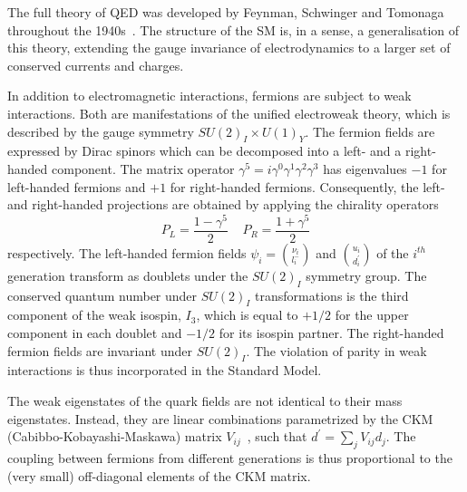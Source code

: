 The full theory of QED was developed by Feynman, Schwinger and Tomonaga throughout the 1940s~\cite{PhysRev.75.486}.  The structure of the SM is, in a sense, a generalisation of this theory, extending the gauge invariance of electrodynamics to a larger set of conserved currents and charges. 

In addition to electromagnetic interactions, fermions are subject to weak interactions. Both are manifestations of the unified electroweak theory, which is described by the gauge symmetry $SU(2)_I \times U(1)_Y$. The fermion fields are expressed by Dirac spinors which can be decomposed into a left- and a right-handed component. The matrix operator $\gamma^5 = i \gamma^0 \gamma^1 \gamma^2 \gamma^3$ has eigenvalues $-1$ for left-handed fermions and $+1$ for right-handed fermions. Consequently, the left- and right-handed projections are obtained by applying the chirality operators
%
\begin{equation}
P_L = \frac{1-\gamma^5}{2} \; \; \; \; P_R = \frac{1+\gamma^5}{2} 
\end{equation}
%
respectively. The left-handed fermion fields $\psi_i= \binom{\nu_i}{l^-_i}$ and $\binom{u_i}{d^{\prime}_i}$ of the $i^{th}$ generation transform as doublets under the $SU(2)_I$ symmetry group. The conserved quantum number under  $SU(2)_I$ transformations is the third component of the weak isospin, $I_3$, which is equal to $+1/2$ for the upper component in each doublet and $-1/2$ for its isospin partner. The right-handed fermion fields are invariant under $SU(2)_I$. The violation of parity in weak interactions is thus incorporated in the Standard Model.

The weak eigenstates of the quark fields are not identical to their mass eigenstates. Instead, they are linear combinations parametrized by the CKM (Cabibbo-Kobayashi-Maskawa) matrix $V_{ij}$~\cite{CKM}, such that $d^{\prime} = \sum_j V_{ij} d_j$.  The coupling between fermions from different generations is thus proportional to the (very small) off-diagonal elements of the CKM matrix.

